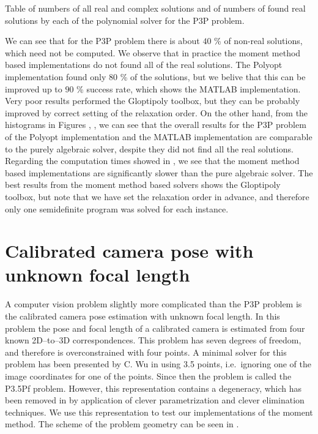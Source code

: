 \begin{table}[ht]
  \centering
  
  \caption{Table of numbers of all real and complex solutions and of numbers of found real solutions by each of the polynomial solver for the P3P problem.}
\end{table}

We can see that for the P3P problem there is about $40$ \% of non-real solutions, which need not be computed.
We observe that in practice the moment method based implementations do not found all of the real solutions.
The Polyopt implementation found only $80$ \% of the solutions, but we belive that this can be improved up to $90$ \% success rate, which shows the MATLAB implementation.
Very poor results performed the Gloptipoly toolbox, but they can be probably improved by correct setting of the relaxation order.
On the other hand, from the histograms in Figures , ,  we can see that the overall results for the P3P problem of the Polyopt implementation and the MATLAB implementation are comparable to the purely algebraic solver, despite they did not find all the real solutions.
Regarding the computation times showed in , we see that the moment method based implementations are significantly slower than the  pure algebraic solver.
The best results from the moment method based solvers shows the Gloptipoly \cite{gloptipoly} toolbox, but note that we have set the relaxation order in advance, and therefore only one semidefinite program was solved for each instance.

\section{Calibrated camera pose with unknown focal length}

A computer vision problem slightly more complicated than the P3P problem is the calibrated camera pose estimation with unknown focal length.
In this problem the pose and focal length of a calibrated camera is estimated from four known 2D--to--3D correspondences.
This problem has seven degrees of freedom, and therefore is overconstrained with four points.
A minimal solver for this problem has been presented by C. Wu in \cite{P35PfWu} using 3.5 points, i.e.\ ignoring one of the image coordinates for one of the points.
Since then the problem is called the P3.5Pf problem.
However, this representation contains a degeneracy, which has been removed in \cite{P35Pf} by application of clever parametrization and clever elimination techniques.
We use this representation to test our implementations of the moment method.
The scheme of the problem geometry can be seen in .

